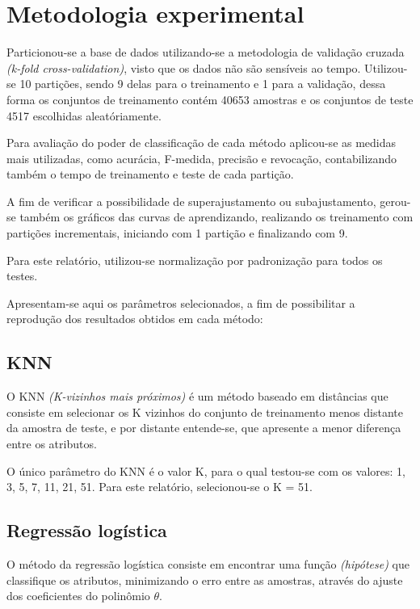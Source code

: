 \section{Metodologia experimental}

Particionou-se a base de dados utilizando-se a metodologia de validação cruzada \emph{(k-fold cross-validation)}, visto que os dados não são sensíveis ao tempo. Utilizou-se 10 partições, sendo 9 delas para o treinamento e 1 para a validação, dessa forma os conjuntos de treinamento contém 40653 amostras e os conjuntos de teste 4517 escolhidas aleatóriamente.

Para avaliação do poder de classificação de cada método aplicou-se as medidas mais utilizadas, como acurácia, F-medida, precisão e revocação, contabilizando também o tempo de treinamento e teste de cada partição.

A fim de verificar a possibilidade de superajustamento ou subajustamento, gerou-se também os gráficos das curvas de aprendizando, realizando os treinamento com partições incrementais, iniciando com 1 partição e finalizando com 9.

Para este relatório, utilizou-se normalização por padronização para todos os testes.

Apresentam-se aqui os parâmetros selecionados, a fim de possibilitar a reprodução dos resultados obtidos em cada método:

\subsection{KNN}

O KNN \emph{(K-vizinhos mais próximos)} é um método baseado em distâncias que consiste em selecionar os K vizinhos do conjunto de treinamento menos distante da amostra de teste, e por distante entende-se, que apresente a menor diferença entre os atributos.

O único parâmetro do KNN é o valor K, para o qual testou-se com os valores: 1, 3, 5, 7, 11, 21, 51. Para este relatório, selecionou-se o K = 51.

\subsection{Regressão logística}

O método da regressão logística consiste em encontrar uma função \emph{(hipótese)} que classifique os atributos, minimizando o erro entre as amostras, através do ajuste dos coeficientes do polinômio \(\theta\).

